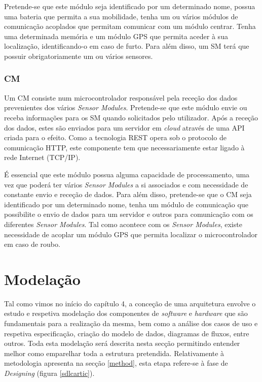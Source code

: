 Pretende-se que este módulo seja identificado por um determinado nome, possua uma bateria que permita a sua mobilidade, tenha um ou vários módulos de comunicação acoplados que permitam comunicar com um módulo centrar. Tenha uma determinada memória e um módulo \ac{GPS} que permita aceder à sua localização, identificando-o em caso de furto. Para além disso, um \acl{SM} terá que possuir obrigatoriamente um ou vários sensores.



\subsubsection{\acl{CM}}



Um \acl{CM} consiste num microcontrolador responsável pela receção dos dados prevenientes dos vários \textit{Sensor Modules}. Pretende-se que este módulo envie ou receba informações para os \acl{SM} quando solicitados pelo utilizador. Após a receção dos dados, estes são enviados para um servidor em \textit{cloud} através de uma \ac{API} criada para o efeito. Como a tecnologia \ac{REST} opera sob o protocolo de comunicação \ac{HTTP}, este componente tem que necessariamente estar ligado à rede Internet (\ac{TCP}/\ac{IP}). 

É essencial que este módulo possua alguma capacidade de processamento, uma vez que poderá ter vários \textit{Sensor Modules} a si associados e com necessidade de constante envio e receção de dados.  Para além disso, pretende-se que o \acl{CM} seja identificado por um determinado nome, tenha um  módulo de comunicação que possibilite o envio de dados para um servidor e outros para comunicação com os diferentes \textit{Sensor Modules}. Tal como acontece com os \textit{Sensor Modules}, existe necessidade de acoplar um módulo \ac{GPS} que permita localizar o microcontrolador em caso de roubo.
 


\section{Modelação}

Tal como vimos no início do capítulo 4, a conceção de uma arquitetura envolve o estudo e respetiva modelação dos componentes de \textit{software} e \textit{hardware} que são fundamentais para a realização da mesma, bem como a análise dos casos de uso e respetiva especificação, criação do modelo de dados, diagramas de fluxos, entre outros. Toda esta modelação será descrita nesta secção permitindo entender melhor como emparelhar toda a estrutura pretendida. Relativamente à metodologia apresenta na secção \ref{method}, esta etapa refere-se à fase de \textit{Designing} (figura \ref{sdlcartic}). 

